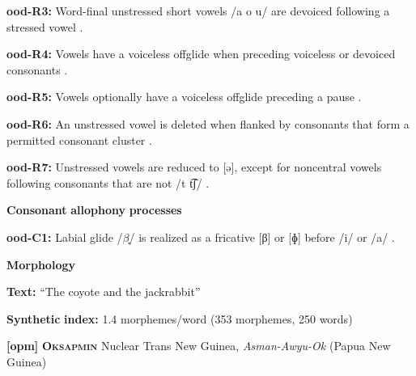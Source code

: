 \documentclass[output=paper]{langsci/langscibook}
\begin{document}
\begin{styleBody}
\textbf{ood-R3:} Word-final unstressed short vowels /a o u/ are devoiced following a stressed vowel \citep[31]{Saxton1963}.
\end{styleBody}

\begin{styleBody}
\textbf{ood-R4:} Vowels have a voiceless offglide when preceding voiceless or devoiced consonants \citep[31]{Saxton1963}.
\end{styleBody}

\begin{styleBody}
\textbf{ood-R5:} Vowels optionally have a voiceless offglide preceding a pause \citep[31]{Saxton1963}.
\end{styleBody}

\begin{styleBody}
\textbf{ood-R6:} An unstressed vowel is deleted when flanked by consonants that form a permitted consonant cluster \citep[103]{Saxton1982}.
\end{styleBody}

\begin{styleBody}
\textbf{ood-R7:} Unstressed vowels are reduced to [ə], except for noncentral vowels following consonants that are not /t t͡ʃ/ \citep[104]{Saxton1982}.
\end{styleBody}

\begin{styleBody}
\textbf{Consonant} \textbf{allophony} \textbf{processes}
\end{styleBody}

\begin{styleBody}
\textbf{ood-C1:} Labial glide /$\beta ̞$/ is realized as a fricative [β] or [ɸ] before /i/ or /a/ \citep[31]{Saxton1963}.
\end{styleBody}

\begin{styleBody}
\textbf{Morphology}
\end{styleBody}

\begin{styleBody}
\textbf{Text:} “The coyote and the jackrabbit” \citep[263-266]{Saxton1982}
\end{styleBody}

\begin{styleBody}
\textbf{Synthetic} \textbf{index:} 1.4 morphemes/word (353 morphemes, 250 words)
\end{styleBody}

\begin{styleBody}
\textbf{[opm]}   \textbf{\textsc{Oksapmin}}  Nuclear Trans New Guinea, \textit{Asman-Awyu-Ok} (Papua New Guinea)
\end{styleBody}
\end{document}
